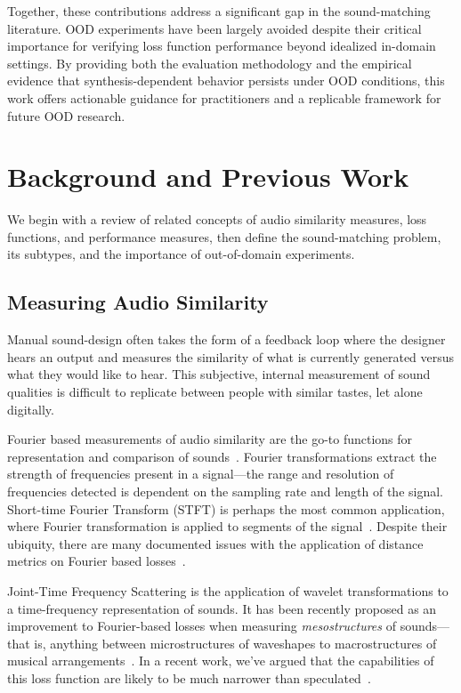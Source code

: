 \documentclass[10pt]{article} %
\begin{document}
Together, these contributions address a significant gap in the sound-matching literature. OOD experiments have been largely avoided despite their critical importance for verifying loss function performance beyond idealized in-domain settings. By providing both the evaluation methodology and the empirical evidence that synthesis-dependent behavior persists under OOD conditions, this work offers actionable guidance for practitioners and a replicable framework for future OOD research.


\section{Background and Previous Work}
We begin with a review of related concepts of audio similarity measures, loss functions, and performance measures, then define the sound-matching problem, its subtypes, and the importance of out-of-domain experiments.

\subsection{Measuring Audio Similarity}
\label{sec:measuring_audio_similarity}
Manual sound-design often takes the form of a feedback loop where the designer hears an output and measures the similarity of what is currently generated versus what they would like to hear. This subjective, internal measurement of sound qualities is difficult to replicate between people with similar tastes, let alone digitally. 

Fourier based measurements of audio similarity are the go-to functions for representation and comparison of sounds~\cite{smith2007mathematics}. Fourier transformations extract the strength of frequencies present in a signal---the range and resolution of frequencies detected is dependent on the sampling rate and length of the signal. Short-time Fourier Transform (STFT) is perhaps the most common application, where Fourier transformation is applied to segments of the signal~\cite{smith2007mathematics}. Despite their ubiquity, there are many documented issues with the application of distance metrics on Fourier based losses~\cite{turian2020sorry,salimi2025evaluating,vahidi2023mesostructures}.

Joint-Time Frequency Scattering is the application of wavelet transformations to a time-frequency representation of sounds. It has been recently proposed as an improvement to Fourier-based losses when measuring \textit{mesostructures} of sounds---that is, anything between microstructures of waveshapes to macrostructures of musical arrangements~\cite{lostanlen2019shape}. In a recent work, we've argued that the capabilities of this loss function are likely to be much narrower than speculated~\cite{salimi2025evaluating}.
\end{document}
